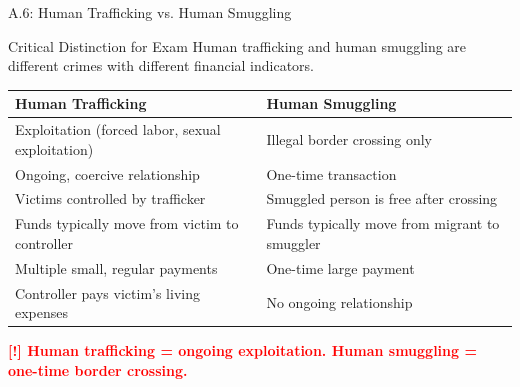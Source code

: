 \documentclass[11pt,a4paper]{beamer}
\newcommand{\redflag}[1]{\textcolor{red}{\textbf{[!] #1}}}
\begin{document}
	
	\begin{frame}{A.6: Human Trafficking vs. Human Smuggling}
		\begin{block}{Critical Distinction for Exam}
			Human trafficking and human smuggling are different crimes with different financial indicators.
		\end{block}
		\begin{tabular}{p{}|p{}}
			\hline
			\rowcolor{lightgray}
			\textbf{Human Trafficking} & \textbf{Human Smuggling} \\
			\hline
			Exploitation (forced labor, sexual exploitation) & Illegal border crossing only \\
			Ongoing, coercive relationship & One-time transaction \\
			Victims controlled by trafficker & Smuggled person is free after crossing \\
			Funds typically move from victim to controller & Funds typically move from migrant to smuggler \\
			Multiple small, regular payments & One-time large payment \\
			Controller pays victim's living expenses & No ongoing relationship \\
			\hline
		\end{tabular}
		\vspace{0.2cm}
		\redflag{Human trafficking = ongoing exploitation. Human smuggling = one-time border crossing.}
	\end{frame}
	
\end{document}
